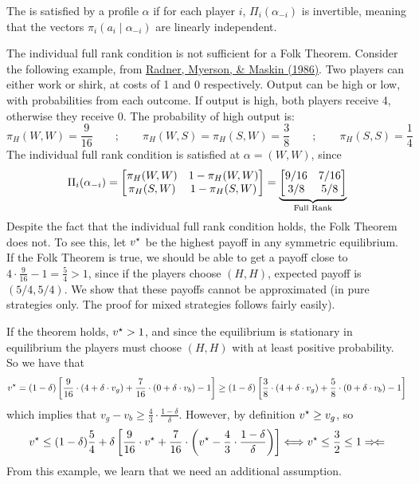 \documentclass[10pt]{article}
\begin{document}
\begin{lemma}\label{lem:indiv_full_rank}
	The  is satisfied by a profile $\alpha$ if for each player $i$, $\Pi_i(\alpha_{-i})$ is invertible, meaning that the vectors $\pi_i(a_i \mid \alpha_{-i})$ are linearly independent.
\end{lemma}

\begin{remark}
	The individual full rank condition is not sufficient for a Folk Theorem. Consider the following example, from \href{https://www.jstor.org/stable/2297591}{Radner, Myerson, \& Maskin (1986)}. Two players can either work or shirk, at costs of 1 and 0 respectively. Output can be high or low, with probabilities from each outcome. If output is high, both players receive 4, otherwise they receive 0. The probability of high output is:\[\pi_H(W,W) = \frac{9}{16} \qquad ; \qquad \pi_H(W,S) = \pi_H(S,W) = \frac{3}{8} \qquad ; \qquad \pi_H(S,S) = \frac{1}{4}\]The individual full rank condition is satisfied at $\alpha = (W,W)$, since \[\Pi_i(\alpha_{-i}) = \begin{bmatrix}\pi_H(W,W) & 1 - \pi_H(W,W) \\ \pi_H(S,W) & 1-\pi_H(S,W)\end{bmatrix} = \underbrace{\begin{bmatrix} 9/16 & 7/16 \\ 3/8 & 5/8\end{bmatrix}}_{\text{Full Rank}}\] Despite the fact that the individual full rank condition holds, the Folk Theorem does not. To see this, let $v^\star$ be the highest payoff in any symmetric equilibrium. If the Folk Theorem is true, we should be able to get a payoff close to $4 \cdot \frac{9}{16} - 1 = \frac{5}{4} > 1$, since if the players choose $(H,H)$, expected payoff is $(5/4,5/4)$. We show that these payoffs cannot be approximated (in pure strategies only. The proof for mixed strategies follows fairly easily).
	
	If the theorem holds, $v^\star > 1$, and since the equilibrium is stationary in equilibrium the players must choose $(H,H)$ with at least positive probability. So we have that \[v^\star = (1-\delta) \left[ \frac{9}{16} \cdot (4 + \delta \cdot v_g) + \frac{7}{16} \cdot (0 + \delta \cdot v_b) - 1\right] \ge (1-\delta) \left[ \frac{3}{8} \cdot (4 + \delta \cdot v_g) + \frac{5}{8} \cdot (0 + \delta \cdot v_b) - 1\right]\]which implies that $v_g - v_b \ge \frac{4}{3}\cdot \frac{1-\delta}{\delta}$. However, by definition $v^\star \ge v_g$, so \[v^\star \le (1-\delta)\frac{5}{4}+ \delta \left[ \frac{9}{16} \cdot v^\star + \frac{7}{16} \cdot \left( v^\star - \frac{4}{3} \cdot \frac{1-\delta}{\delta}\right) \right] \Longleftrightarrow v^\star \le \frac{3}{2} \le 1 \Rightarrow \! \Leftarrow\]
	From this example, we learn that we need an additional assumption.
 \end{remark}
 
\end{document}
